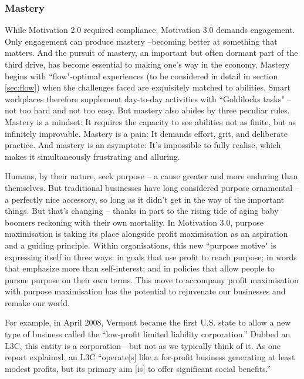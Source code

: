 \subsubsection{Mastery}
While Motivation 2.0 required compliance, Motivation 3.0 demands engagement. Only engagement can produce mastery --becoming better at something that matters. And the pursuit of mastery, an important but often dormant part of the third drive, has become essential to making one’s way in the economy. Mastery begins with ``flow"-optimal experiences (to be considered in detail in section \ref{sec:flow}) when the challenges faced are exquisitely matched to abilities. Smart workplaces therefore supplement day-to-day activities with ``Goldilocks tasks" -- not too hard and not too easy. But mastery also abides by three peculiar rules. Mastery is a mindset: It requires the capacity to see abilities not as finite, but as infinitely improvable. Mastery is a pain: It demands effort, grit, and deliberate practice. And mastery is an asymptote: It’s impossible to fully realise, which makes it simultaneously frustrating and alluring.

Humans, by their nature, seek purpose -- a cause greater and more enduring than themselves. But traditional businesses have long considered purpose ornamental -- a perfectly nice accessory, so long as it didn’t get in the way of the important things. But that’s changing -- thanks in part to the rising tide of aging baby boomers reckoning with their own mortality. In Motivation 3.0, purpose maximisation is taking its place alongside profit maximisation as an aspiration and a guiding principle. Within organisations, this new ``purpose motive" is expressing itself in three ways: in goals that use profit to reach purpose; in words that emphasize more than self-interest; and in policies that allow people to pursue purpose on their own terms. This move to accompany profit maximisation with purpose maximisation has the potential to rejuvenate our businesses and remake our world.

For example, in April 2008, Vermont became the first U.S. state to allow a new type of business called the “low-profit limited liability corporation.” Dubbed an L3C, this entity is a corporation—but not as we typically think of it. As one report explained, an L3C “operate[s] like a for-profit business generating at least modest profits, but its primary aim [is] to offer significant social benefits.”

